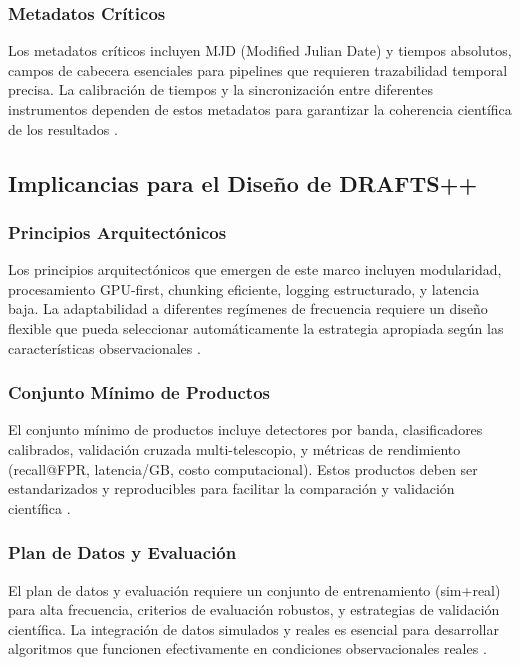\subsubsection{Metadatos Críticos}

Los metadatos críticos incluyen MJD (Modified Julian Date) y tiempos absolutos, campos de cabecera esenciales para pipelines que requieren trazabilidad temporal precisa. La calibración de tiempos y la sincronización entre diferentes instrumentos dependen de estos metadatos para garantizar la coherencia científica de los resultados \citep{Hotan_2004_PSRFITS}.

\subsection{Implicancias para el Diseño de DRAFTS++}

\subsubsection{Principios Arquitectónicos}

Los principios arquitectónicos que emergen de este marco incluyen modularidad, procesamiento GPU-first, chunking eficiente, logging estructurado, y latencia baja. La adaptabilidad a diferentes regímenes de frecuencia requiere un diseño flexible que pueda seleccionar automáticamente la estrategia apropiada según las características observacionales \citep{zhang2024drafts}.

\subsubsection{Conjunto Mínimo de Productos}

El conjunto mínimo de productos incluye detectores por banda, clasificadores calibrados, validación cruzada multi-telescopio, y métricas de rendimiento (recall@FPR, latencia/GB, costo computacional). Estos productos deben ser estandarizados y reproducibles para facilitar la comparación y validación científica \citep{zhang2024drafts}.

\subsubsection{Plan de Datos y Evaluación}

El plan de datos y evaluación requiere un conjunto de entrenamiento (sim+real) para alta frecuencia, criterios de evaluación robustos, y estrategias de validación científica. La integración de datos simulados y reales es esencial para desarrollar algoritmos que funcionen efectivamente en condiciones observacionales reales \citep{zhang2024drafts}.

